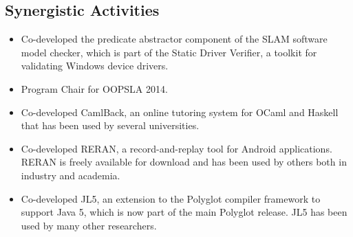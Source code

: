 \documentclass[11pt]{article}
\begin{document}
\subsection*{Synergistic Activities}
\begin{itemize}  
\item Co-developed the predicate abstractor component
of the SLAM software model checker,
which is part of the Static Driver Verifier, a toolkit for validating Windows device
drivers.


\item Program Chair for OOPSLA 2014.

\item Co-developed CamlBack, an online tutoring system for OCaml and
  Haskell that has been used by several universities.

\item Co-developed RERAN, a record-and-replay tool for Android applications.
 RERAN is freely available for download and has been used by others
 both in industry and academia.


\item Co-developed JL5, an extension to the Polyglot compiler
  framework to support Java 5, which is now part of the main Polyglot
  release. 
JL5 has been used by many other researchers.




\end{itemize}

\end{document}
